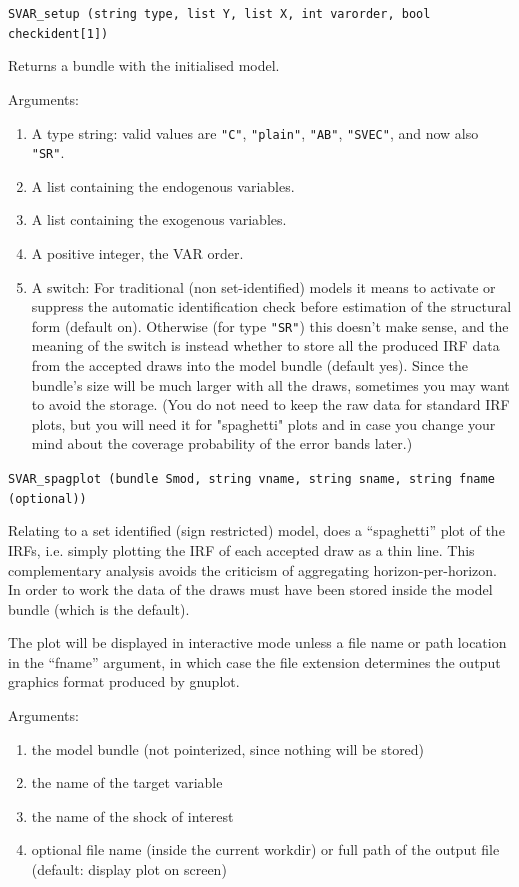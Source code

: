 \documentclass[a4paper,10pt]{article}
\newenvironment{funcdoc}[1]
{\noindent\hrulefill\newline\nopagebreak\texttt{#1}%
\nopagebreak\par\noindent\hrulefill%
\nopagebreak\par\nopagebreak\smallskip\nopagebreak\par}
{\bigskip}
\begin{document}
\begin{funcdoc}{SVAR\_setup (string type, list Y, list X, int varorder, 
  bool checkident[1])}
  \noindent Returns a bundle with the initialised model. 
  
  \noindent Arguments:
  \begin{enumerate}
  \item A type string: valid values are \texttt{"C"},
    \texttt{"plain"}, \texttt{"AB"}, \texttt{"SVEC"}, and now also \texttt{"SR"}.
  \item A list containing the endogenous variables.
  \item A list containing the exogenous variables.
  \item A positive integer, the VAR order.
  \item A switch: For traditional (non set-identified) models it means to activate or suppress 
   the automatic identification check before estimation of the structural form (default on). 
   Otherwise (for type \texttt{"SR"}) this doesn't make sense, and the meaning of the switch
   is instead whether to store all the produced IRF data from the accepted draws into the 
   model bundle (default yes). Since the bundle's size will be much larger with all the draws,
   sometimes you may want to avoid the storage. (You do not need to keep the raw data for 
   standard IRF plots, but you will need it for "spaghetti" plots and in case you change your 
   mind about the coverage probability of the error bands later.)
  \end{enumerate}
\end{funcdoc}

\begin{funcdoc}{SVAR\_spagplot (bundle Smod, string vname, string sname, 
 string fname (optional))}
 \noindent Relating to a set identified (sign restricted) model, does a 
  ``spaghetti'' plot of the IRFs, i.e. simply plotting the IRF of each accepted
  draw as a thin line. This complementary analysis avoids the criticism of 
  aggregating horizon-per-horizon. 
 In order to work the data of the draws must have been stored inside the model
  bundle (which is the default).

  The plot will be displayed in interactive mode unless a file name or path
  location in the ``fname'' argument, in which case the file extension determines
  the output graphics format produced by gnuplot.
 
 \noindent Arguments:
 \begin{enumerate}
  \item the model bundle (not pointerized, since nothing will be stored)
  \item the name of the target variable
  \item the name of the shock of interest
  \item optional file name (inside the current workdir) or full path of the output file 
   (default: display plot on screen)
 \end{enumerate}


\end{funcdoc}
\end{document}
